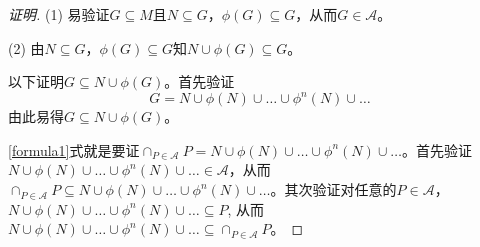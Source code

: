 \begin{proof}[证明]
  (1) 易验证$G\subseteq M$且$N\subseteq G$，$\phi(G) \subseteq G$，从而$G \in \mathscr{A}$。

  (2) 由$N\subseteq G$，$\phi(G) \subseteq G$知$N\cup \phi(G) \subseteq G$。

  以下证明$G \subseteq N\cup \phi(G)$。首先验证
  \begin{equation}\label{formula1}
  G=N \cup \phi(N) \cup \ldots \cup \phi^n(N) \cup \ldots
  \end{equation}
  由此易得$G \subseteq N\cup \phi(G)$。

  \eqref{formula1}式就是要证$\cap_{P\in \mathscr{A}}P = N \cup \phi(N) \cup \ldots \cup \phi^n(N) \cup \ldots$。首先验证$N \cup \phi(N) \cup \ldots \cup \phi^n(N) \cup \ldots \in \mathscr{A}$，从而$\cap_{P\in \mathscr{A}}P \subseteq  N \cup \phi(N) \cup \ldots \cup \phi^n(N) \cup \ldots$。其次验证对任意的$P\in \mathscr{A}$，$N \cup \phi(N) \cup \ldots \cup \phi^n(N) \cup \ldots \subseteq P$, 从而$N \cup \phi(N) \cup \ldots \cup \phi^n(N) \cup \ldots \subseteq \cap_{P\in \mathscr{A}}P$。  
\end{proof}
